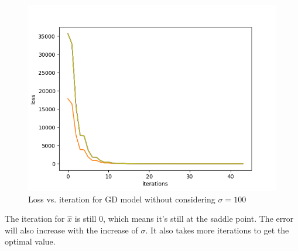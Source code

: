 \documentclass[a4paper]{article}
\begin{document}
    \begin{figure}[H]
        \centering
        \includegraphics[scale=0.5]{Loss.png}
        \caption{Loss vs. iteration for GD model without considering $\sigma=100$}
    \end{figure}
    The iteration for $\hat{x}$ is still 0, which means it's still at the saddle point. The error will also increase with the increase of $\sigma$. It also takes more iterations to get the optimal value.
\end{document}

